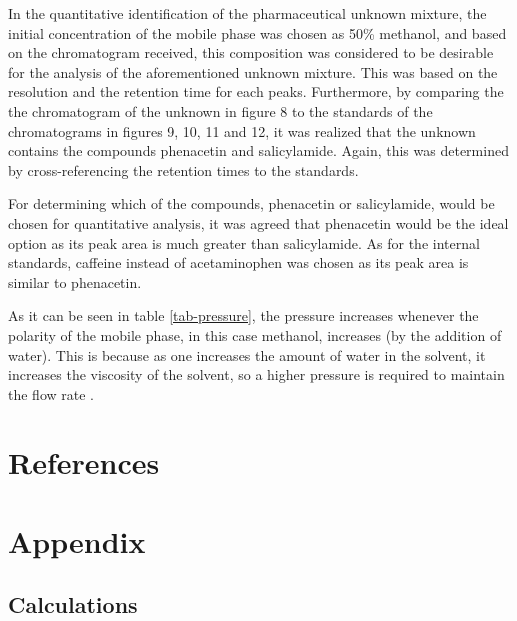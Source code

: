 \documentclass[a4paper, 12pt]{article}
\begin{document}
In the quantitative identification of the pharmaceutical unknown mixture, the initial concentration of the mobile phase was chosen as 50\% methanol, and based on the chromatogram received, this composition was considered to be desirable for the analysis of the aforementioned unknown mixture. This was based on the resolution and the retention time for each peaks. Furthermore, by comparing the the chromatogram of the unknown in figure 8 to the standards of the chromatograms in figures 9, 10, 11 and 12, it was realized that the unknown contains the compounds phenacetin and salicylamide. Again, this was determined by cross-referencing the retention times to the standards.

For determining which of the compounds, phenacetin or salicylamide, would be chosen for quantitative analysis, it was agreed that phenacetin would be the ideal option as its peak area is much greater than salicylamide. As for the internal standards, caffeine instead of acetaminophen was chosen as its peak area is similar to phenacetin.

As it can be seen in table \ref{tab-pressure}, the pressure increases whenever the polarity of the mobile phase, in this case methanol, increases (by the addition of water). This is because as one increases the amount of water in the solvent, it increases the viscosity of the solvent, so a higher pressure is required to maintain the flow rate \cite{harris}.


\section{References}
\printbibliography


\section{Appendix}

\subsection{Calculations}
\end{document}
